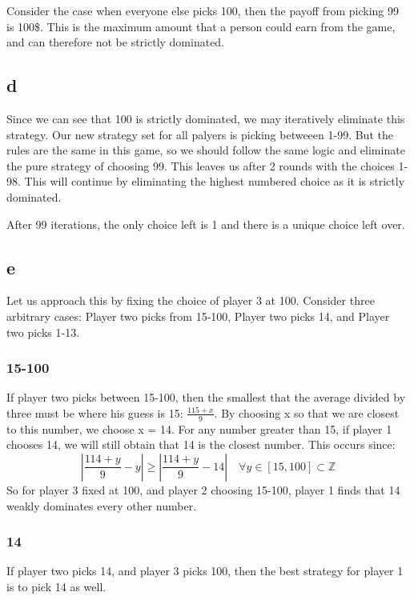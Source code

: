 \documentclass[10pt]{paper}
\begin{document}
Consider the case when everyone else picks 100, then the payoff from
picking 99 is 100\$. This is the maximum amount that a person could
earn from the game, and can therefore not be strictly dominated.

\subsection*{d}

Since we can see that 100 is strictly dominated, we may iteratively
eliminate this strategy. Our new strategy set for all palyers is
picking betweeen 1-99. But the rules are the same in this game, so we
should follow the same logic and eliminate the pure strategy of
choosing 99. This leaves us after 2 rounds with the choices 1-98. This
will continue by eliminating the highest numbered choice as it is
strictly dominated.

After 99 iterations, the only choice left is 1 and there is a unique
choice left over.

\subsection*{e}

Let us approach this by fixing the choice of player 3 at 100. Consider
three arbitrary cases: Player two picks from 15-100, Player two picks
14, and Player two picks 1-13.

\subsubsection*{15-100}

If player two picks between 15-100, then the smallest that the average
divided by three must be where his guess is 15: $\frac{115+x}{9}$.
By choosing x so that we are closest to this number, we choose x =
14. For any number greater than 15, if player 1 chooses 14, we will
still obtain that 14 is the closest number. This occurs since:
$$\left | \frac{114+y}{9} - y \right | \geq \left | \frac{114+y}{9} - 14
\right | \quad \forall y \in [15,100] \subset \mathbb{Z}$$
So for player 3 fixed at 100, and player 2 choosing 15-100, player 1
finds that 14 weakly dominates every other number.

\subsubsection*{14}
If player two picks 14, and player 3 picks 100, then the best strategy
for player 1 is to pick 14 as well.
\end{document}
